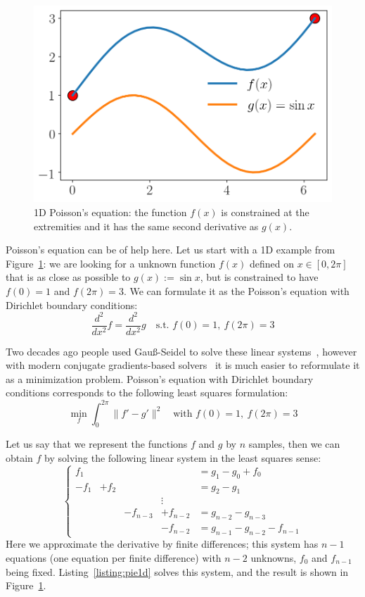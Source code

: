\documentclass[notitlepage,oneside]{book}
\begin{document}
\begin{figure}[tb]
    \centering
    \includegraphics[width=.34\linewidth]{img/pie-1d.png}
    \caption{1D Poisson's equation: the function $f(x)$ is constrained at the extremities and it has the same second derivative as $g(x)$.}
    \label{fig:pie1d}
\end{figure}

Poisson's equation can be of help here. Let us start with a 1D example from Figure~\ref{fig:pie1d}: we are looking for a unknown function $f(x)$ defined on $x\in[0,2\pi]$ that is as close as possible to $g(x):=\sin x$, but is constrained to have $f(0)=1$ and $f(2\pi) = 3$.
We can formulate it as the Poisson's equation with Dirichlet boundary conditions:
$$
\frac{d^2}{dx^2}f  = \frac{d^2}{dx^2} g \quad \text{s.t.~} f(0)=1,~f(2\pi) = 3
$$

Two decades ago people used Gauß-Seidel to solve these linear systems~\cite{10.1145/882262.882269},
however with modern conjugate gradients-based solvers~\cite{OpenNL} it is much easier to reformulate it as a minimization problem.
Poisson's equation with Dirichlet boundary conditions corresponds to the following least squares formulation:
$$
\min\limits_{f} \int_0^{2\pi} \|f' - g'\|^2 \quad \text{with~} f(0)=1,~f(2\pi) = 3
$$

Let us say that we represent the functions $f$ and $g$ by $n$ samples, then we can obtain $f$ by solving the following linear system in the least squares sense:
\begin{equation}
\label{eq:pie1d}
\left \{ \begin{array}{ccccl}
f_1 &       &       &           & =  g_1 - g_0 + f_0  \\
-f_1 & + f_2 &       &           & = g_2 - g_1 \\
    &       &       & \vdots    &             \\
     &        &  -f_{n-3}     &  +f_{n-2}          & = g_{n-2} - g_{n-3} \\
     &        &       & - f_{n-2} & =  g_{n-1}-g_{n-2} -f_{n-1}
\end{array} \right.
\end{equation}
Here we approximate the derivative by finite differences;
this system has $n-1$ equations (one equation per finite difference) with $n-2$ unknowns, $f_0$ and $f_{n-1}$ being fixed.
Listing~\ref{listing:pie1d} solves this system, and the result is shown in  Figure~\ref{fig:pie1d}.
\end{document}
